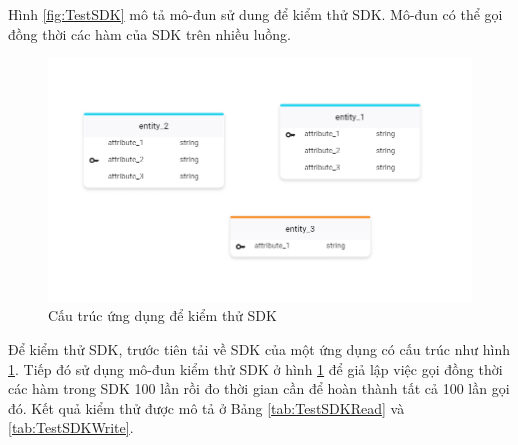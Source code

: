\documentclass[../DoAn.tex]{subfiles}
\begin{document}
Hình \ref{fig:TestSDK} mô tả mô-đun sử dung để kiểm thử SDK. Mô-đun có thể gọi
đồng thời các hàm của SDK trên nhiều luồng.

\begin{figure}[H]
    \centering
    \includegraphics[width=0.75\linewidth]{Hinhve/DoAn-TestSDKDapp.png}
    \caption{Cấu trúc ứng dụng để kiểm thử SDK}
    \label{fig:TestSDKDapp}
\end{figure}

Để kiểm thử SDK, trước tiên tải về SDK của một ứng dụng có cấu trúc như hình \ref{fig:TestSDKDapp}. Tiếp đó sử dụng mô-đun kiểm thử SDK ở hình \ref{fig:TestSDKDapp} để giả lập việc gọi đồng thời các hàm trong SDK 100 lần rồi đo thời gian cần để hoàn thành tất cả 100 lần gọi đó. Kết quả kiểm thử được mô tả ở Bảng \ref{tab:TestSDKRead} và \ref{tab:TestSDKWrite}.
\end{document}
